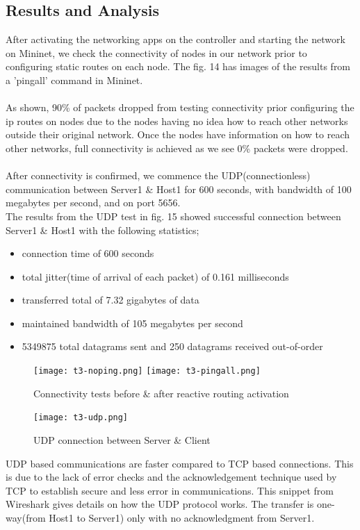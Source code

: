\documentclass{article}
\begin{document}
\subsection{Results and Analysis}
After activating the networking apps on the controller and starting the network on Mininet, we check the connectivity of nodes in our network prior to configuring static routes on each node. The fig. 14 has images of the results from a 'pingall' command in Mininet. \\\\ As shown, 90\% of packets dropped from testing connectivity prior configuring the ip routes on nodes due to the nodes having no idea how to reach other networks outside their original network. Once the nodes have information on how to reach other networks, full connectivity is achieved as we see 0\% packets were dropped. \\\\  After connectivity is confirmed, we commence the UDP(connectionless) communication between Server1 \& Host1 for 600 seconds, with bandwidth of 100 megabytes per second, and on port 5656. \\ The results from the UDP test in fig. 15 showed successful connection between Server1 \& Host1 with the following statistics;
	\begin{itemize}
		\item connection time of 600 seconds
		\item total jitter(time of arrival of each packet) of 0.161 milliseconds
		\item transferred total of 7.32 gigabytes of data
		\item maintained bandwidth of 105 megabytes per second
		\item 5349875 total datagrams sent and 250 datagrams received out-of-order
	\end{itemize}
\begin{center}
  	\begin{figure}[h]
			\texttt{[image: t3-noping.png]}
		\endminipage{} 
			\texttt{[image: t3-pingall.png]}
		\endminipage{}
            	\caption{Connectivity tests before \& after reactive routing activation}
            	\label{fig:t3-2}
        \end{figure} 
	\vspace{10pt}
        \begin{figure}[h]
        		\centering
		\texttt{[image: t3-udp.png]}
		\caption{UDP connection between Server \& Client}
		\label{fig:t3-3}
        \end{figure}
\end{center}
\par UDP based communications are faster compared to TCP based connections. This is due to the lack of error checks and the acknowledgement technique used by TCP to establish secure and less error in communications. This snippet from Wireshark gives details on how the UDP protocol works. The transfer is one-way(from Host1 to Server1) only with no acknowledgment from Server1.
\end{document}
